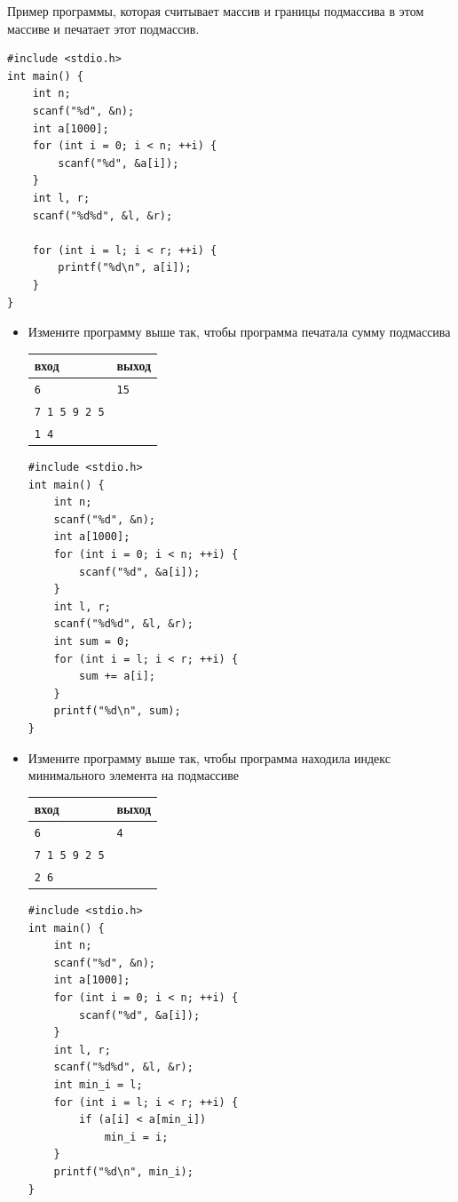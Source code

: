 \documentclass{article}
\begin{document}
Пример программы, которая считывает массив и границы подмассива в этом массиве и печатает этот подмассив.
\begin{lstlisting}
#include <stdio.h>
int main() {
    int n;
    scanf("%d", &n);
    int a[1000];
    for (int i = 0; i < n; ++i) {
        scanf("%d", &a[i]);
    }
    int l, r;
    scanf("%d%d", &l, &r);

    for (int i = l; i < r; ++i) {
        printf("%d\n", a[i]); 
    }
}
\end{lstlisting}

\newpage
\begin{itemize}
\item Измените программу выше так, чтобы программа печатала сумму подмассива
\begin{center}
\begin{tabular}{ l | l }
 вход & выход \\ \hline
 \texttt{6} & \texttt{15}  \\ 
 \texttt{7 1 5 9 2 5} &   \\ 
 \texttt{1 4} &   \\ 
\end{tabular}
\end{center}

\begin{lstlisting}[backgroundcolor = \color{solcolor}]
#include <stdio.h>
int main() {
    int n;
    scanf("%d", &n);
    int a[1000];
    for (int i = 0; i < n; ++i) {
        scanf("%d", &a[i]);
    }
    int l, r;
    scanf("%d%d", &l, &r);
    int sum = 0;
    for (int i = l; i < r; ++i) {
        sum += a[i]; 
    }
    printf("%d\n", sum);
}
\end{lstlisting}

\item Измените программу выше так, чтобы программа находила индекс минимального элемента на подмассиве
\begin{center}
\begin{tabular}{ l | l }
 вход & выход \\ \hline
 \texttt{6} & \texttt{4}  \\ 
 \texttt{7 1 5 9 2 5} &   \\ 
 \texttt{2 6} &   \\ 
\end{tabular}
\end{center}

\begin{lstlisting}[backgroundcolor = \color{solcolor}]
#include <stdio.h>
int main() {
    int n;
    scanf("%d", &n);
    int a[1000];
    for (int i = 0; i < n; ++i) {
        scanf("%d", &a[i]);
    }
    int l, r;
    scanf("%d%d", &l, &r);
    int min_i = l;
    for (int i = l; i < r; ++i) {
        if (a[i] < a[min_i])
            min_i = i;
    }
    printf("%d\n", min_i);
}
\end{lstlisting}



\end{itemize}
\end{document}
